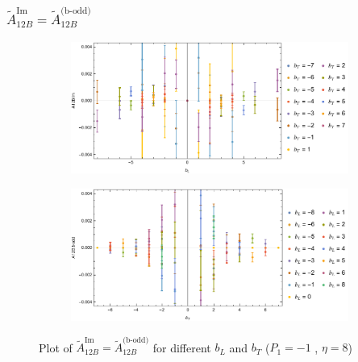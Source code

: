 \documentclass[]{article}
\numberwithin{equation}{section}
\newcommand{\tAmp}{\widetilde{A}}
\newcommand{\tAmp}{\ensuremath{\widetilde{A}^{(+)}}}
\begin{document}
\subsubsection{$\tAmp^{\text{Im}}_{12B}=\tAmp^{\text{(b-odd)}}_{12B}$}
\begin{figure}[h!]
     \centering
     \begin{subfigure}[b]{0.45\textwidth}
         \centering
         \includegraphics[width=\textwidth]{Amp_plots/bL_A12B_b_odd_P1_-1_eta_8.pdf}
     \end{subfigure}
     \begin{subfigure}[b]{0.45\textwidth}
         \centering
         \includegraphics[width=\textwidth]{Amp_plots/bT_A12B_b_odd_P1_-1_eta_8.pdf}
     \end{subfigure}
        \caption{Plot of  $\tAmp^{\text{Im}}_{12B}=\tAmp^{\text{(b-odd)}}_{12B}$ for different $b_{L}$ and $b_{T}$  ($P_{1} = -1$ , $\eta=8$)}
\end{figure}
\end{document}
